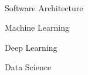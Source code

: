

      ‌

      \begin{cvitems}
        \item {Software Architecture}
        \item {Machine Learning}
        \item {Deep Learning}
        \item {Data Science}
      \end{cvitems}
      ‌

